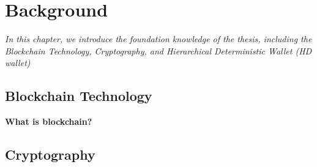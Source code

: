 \chapter{Background}
\label{chap:background}

\textit{In this chapter, we introduce the foundation knowledge of the thesis, including the Blockchain Technology, Cryptography, and Hierarchical Deterministic Wallet (HD wallet)}

\minitoc

\section{Blockchain Technology}
\label{blockchain}
\bigskip
{\textbf{What is blockchain?}}

\section{Cryptography}
\label{cryptography}


